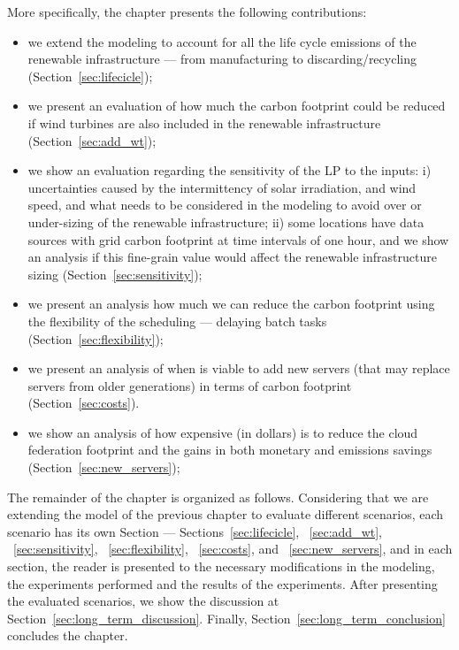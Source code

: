 More specifically, the chapter presents the following contributions:

\begin{itemize}
 
\item we extend the modeling to account for all the life cycle emissions of the renewable infrastructure --- from manufacturing to discarding/recycling (Section~\ref{sec:lifecicle});
\item we present an evaluation of how much the carbon footprint could be reduced if wind turbines are also included in the renewable infrastructure   (Section~\ref{sec:add_wt});
\item we show an evaluation regarding the sensitivity of the LP to the inputs: i) uncertainties caused by the intermittency of solar irradiation, and wind speed, and what needs to be considered in the modeling to avoid over or under-sizing of the renewable infrastructure; ii) some locations have data sources with grid carbon footprint at time intervals of one hour, and we show an analysis if this fine-grain value would affect the renewable infrastructure sizing  (Section~\ref{sec:sensitivity});
\item we present an analysis how much we can reduce the carbon footprint using the flexibility of the scheduling --- delaying batch tasks (Section~\ref{sec:flexibility});
\item we present an analysis of when is viable to add new servers (that may replace servers from older generations) in terms of carbon footprint  (Section~\ref{sec:costs}).
\item we show an analysis of how expensive (in dollars) is to reduce the cloud federation footprint and the gains in both monetary and emissions savings (Section~\ref{sec:new_servers});
  
\end{itemize}

The remainder of the chapter is organized as follows. Considering that we are extending the model of the previous chapter to evaluate different scenarios, each scenario has its own Section --- Sections~\ref{sec:lifecicle}, ~\ref{sec:add_wt}, ~\ref{sec:sensitivity}, ~\ref{sec:flexibility}, ~\ref{sec:costs}, and  ~\ref{sec:new_servers}, and in each section, the reader is presented to the necessary modifications in the modeling, the experiments performed and the results of the experiments. After presenting the evaluated scenarios, we show the discussion at Section~\ref{sec:long_term_discussion}. Finally, Section~\ref{sec:long_term_conclusion} concludes the chapter.



